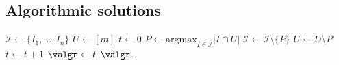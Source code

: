 \subsection{Algorithmic solutions}\label{sec:algo_sol}


\begin{algorithm}[!t]
\caption{\greedy}\label{alg:greedy}
\begin{algorithmic}[1]
\State \(\mathcal{I} \gets \{I_1, \ldots, I_n\} \) 
\State \(U \gets [m]\)
\State \(t \gets 0\)
    \State \(P \gets \mathrm{argmax}_{I \in \mathcal{I}}\bigl|I \cap U\bigr| \) 
    \State \(\mathcal{I} \gets \mathcal{I} \setminus \{P\}\)
    \State \(U \gets U \setminus P\)
    \State \(t \gets t + 1\)
\EndWhile
\State \(\valgr \gets t\)
\State \Return \(\valgr\).
\end{algorithmic}
\end{algorithm}



